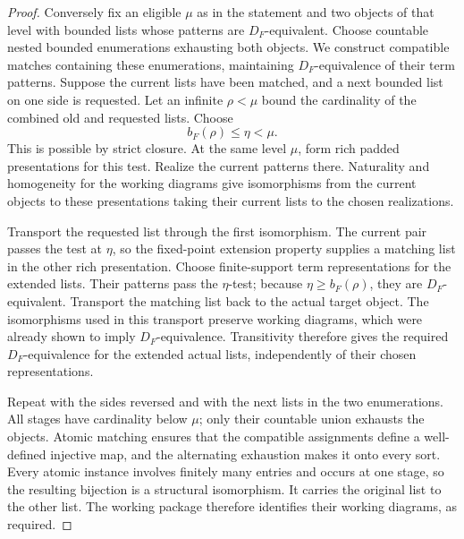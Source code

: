\begin{proof}
Conversely fix an eligible $\mu$ as in the statement and two objects
of that level with bounded lists whose patterns are $D_F$-equivalent.
Choose countable nested bounded enumerations exhausting both objects.
We construct compatible matches containing these enumerations,
maintaining $D_F$-equivalence of their term patterns.  Suppose the
current lists have been matched, and a next bounded list on one side
is requested.  Let an infinite $\rho<\mu$ bound the cardinality of the combined
old and requested lists.  Choose
\[
          b_F(\rho)\leq\eta<\mu.
\]
This is possible by strict closure.  At the same level $\mu$, form
rich padded presentations for this test.  Realize the current
patterns there.  Naturality and homogeneity for the working diagrams
give isomorphisms from the current objects to these presentations
taking their current lists to the chosen realizations.

Transport the requested list through the first isomorphism.  The
current pair passes the test at $\eta$, so the fixed-point extension
property supplies a matching list in the other rich presentation.
Choose finite-support term representations for the extended lists.
Their patterns pass the $\eta$-test; because
$\eta\geq b_F(\rho)$, they are $D_F$-equivalent.  Transport the
matching list back to the actual target object.  The isomorphisms
used in this transport preserve working diagrams, which were
already shown to imply $D_F$-equivalence.  Transitivity therefore
gives the required $D_F$-equivalence for the extended actual lists,
independently of their chosen representations.

Repeat with the sides reversed and with the next lists in the two
enumerations.  All stages have cardinality below $\mu$; only their
countable union exhausts the objects.  Atomic matching ensures that
the compatible assignments define a well-defined injective map, and
the alternating exhaustion makes it onto every sort.  Every atomic
instance involves finitely many entries and occurs at one stage,
so the resulting bijection is a structural isomorphism.  It carries
the original list to the other list.  The working package therefore
identifies their working diagrams, as required.
\end{proof}

